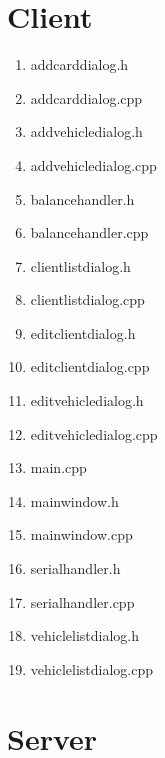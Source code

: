 \documentclass[12pt]{report}
\begin{document}
\section{Client}
\begin{enumerate}
    \item addcarddialog.h
    
    \item addcarddialog.cpp
    
    \newpage

    \item addvehicledialog.h
    
    \item addvehicledialog.cpp
    

    \item balancehandler.h
    
    \item balancehandler.cpp
    

    \item clientlistdialog.h
    
    \item clientlistdialog.cpp
    

    \item editclientdialog.h
    
    \item editclientdialog.cpp
    
    \item editvehicledialog.h
    
    \item editvehicledialog.cpp
    

    \item main.cpp
    
    \item mainwindow.h
    
    \item mainwindow.cpp
    



    \item serialhandler.h
    
    \item serialhandler.cpp
    
    \item vehiclelistdialog.h
    
    \item vehiclelistdialog.cpp
    
 
    
\end{enumerate}
\section{Server}
\end{document}
